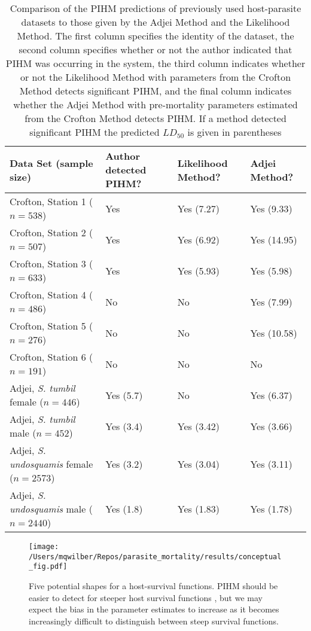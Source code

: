 \documentclass[12pt, a4paper]{article}
\begin{document}
\renewcommand{\arraystretch}{1.2}
\begin{sidewaystable}

    \caption{Comparison of the PIHM predictions of previously used host-parasite datasets to those given by the Adjei Method and the Likelihood Method. The first column specifies the identity of the dataset, the second column specifies whether or not the author indicated that PIHM was occurring in the system, the third column indicates whether or not the Likelihood Method with parameters from the Crofton Method detects significant PIHM, and the final column indicates whether the Adjei Method with pre-mortality parameters estimated from the Crofton Method detects PIHM.  If a method detected significant PIHM the predicted $LD_{50}$ is given in parentheses}

    \centering
    \begin{tabular}{l  p{3cm} p{3cm} l}

    \hline\hline
    Data Set (sample size) & Author detected PIHM? & Likelihood Method?  & Adjei Method? \\

    \hline
    Crofton, Station 1 ($n=538$) & Yes & Yes (7.27) & Yes (9.33) \\
    Crofton, Station 2 ($n=507$) & Yes & Yes (6.92) &  Yes (14.95)\\
    Crofton, Station 3 ($n=633$) & Yes & Yes (5.93) &  Yes (5.98) \\
    Crofton, Station 4 ($n=486$) & No & No &  Yes (7.99) \\
    Crofton, Station 5 ($n=276$) & No & No & Yes (10.58) \\
    Crofton, Station 6 ($n=191$) & No & No & No \\
    Adjei, \emph{S. tumbil} female ($n=446$) & Yes (5.7) & No & Yes (6.37) \\
    Adjei, \emph{S. tumbil} male ($n=452$) & Yes (3.4) & Yes (3.42) & Yes (3.66)  \\
    Adjei, \emph{S. undosquamis} female ($n=2573$) & Yes (3.2) & Yes (3.04) & Yes (3.11) \\
    Adjei, \emph{S. undosquamis} male ($n=2440$) & Yes (1.8) & Yes (1.83) & Yes (1.78) \\


    \end{tabular}
    \label{table:pihm}

\end{sidewaystable}

\begin{figure}
    \texttt{[image: /Users/mqwilber/Repos/parasite\_mortality/results/conceptual\_fig.pdf]}

    \caption{Five potential shapes for a host-survival functions. PIHM should be easier to detect for steeper host survival functions \citep{Lanciani1989}, but we may expect the bias in the parameter estimates to increase as it becomes increasingly difficult to distinguish between steep survival functions.}
    \label{fig:surv}
\end{figure}
\end{document}
